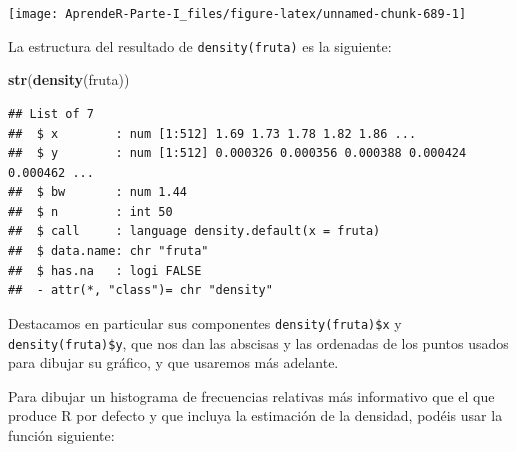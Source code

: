 \documentclass[]{book}
\newenvironment{Shaded}{\begin{snugshade}}{\end{snugshade}}
\newcommand{\KeywordTok}[1]{\textcolor[rgb]{0.13,0.29,0.53}{\textbf{#1}}}
\newcommand{\NormalTok}[1]{#1}
\theoremstyle{definition}
\theoremstyle{definition}
\theoremstyle{definition}
\theoremstyle{remark}
\begin{document}
\begin{center}\texttt{[image: AprendeR-Parte-I\_files/figure-latex/unnamed-chunk-689-1]} \end{center}

La estructura del resultado de \texttt{density(fruta)} es la siguiente:

\begin{Shaded}
\begin{Highlighting}[]
\KeywordTok{str}\NormalTok{(}\KeywordTok{density}\NormalTok{(fruta))}
\end{Highlighting}
\end{Shaded}

\begin{verbatim}
## List of 7
##  $ x        : num [1:512] 1.69 1.73 1.78 1.82 1.86 ...
##  $ y        : num [1:512] 0.000326 0.000356 0.000388 0.000424 0.000462 ...
##  $ bw       : num 1.44
##  $ n        : int 50
##  $ call     : language density.default(x = fruta)
##  $ data.name: chr "fruta"
##  $ has.na   : logi FALSE
##  - attr(*, "class")= chr "density"
\end{verbatim}

Destacamos en particular sus componentes \texttt{density(fruta)\$x} y \texttt{density(fruta)\$y}, que nos dan las abscisas y las ordenadas de los puntos usados para dibujar su gráfico, y que usaremos más adelante.

Para dibujar un histograma de frecuencias relativas más informativo que el que produce R por defecto y que incluya la estimación de la densidad, podéis usar la función siguiente:
\end{document}
